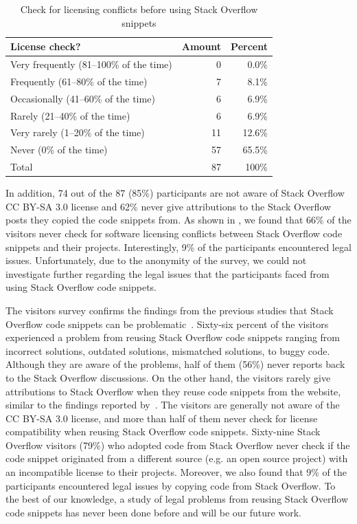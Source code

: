 \documentclass[10pt,journal,compsoc]{IEEEtran}
\begin{document}
\begin{table}
	\centering
	\caption{Check for licensing conflicts before using Stack Overflow snippets}
	\label{tab:visitor_survey_license_check}
	\begin{tabular}{lrr}
		\toprule
		License check? & Amount & Percent \\
		\midrule
		Very frequently (81--100\% of the time) & 0 & 0.0\% \\
		Frequently (61--80\% of the time) & 7 & 8.1\%
\\
		Occasionally (41--60\% of the time) & 6 & 6.9\%
\\
		Rarely (21--40\% of the time) & 6 & 6.9\% \\
		Very rarely (1--20\% of the time) & 11 & 12.6\% \\
		Never (0\% of the time)	& 57 & 65.5\% \\
		\midrule
		Total & 87 & 100\% \\
\bottomrule
\end{tabular}
\end{table}

In addition, 74 out of the 87 (85\%) participants are not
aware of Stack Overflow CC BY-SA 3.0 license and 62\% never give attributions to
the Stack Overflow posts they copied the code snippets from. 
As shown in , we found that 66\%
of the visitors never check for software licensing conflicts between Stack
Overflow code snippets and their projects. Interestingly, 9\% of the
participants encountered legal issues. Unfortunately, due to the anonymity of
the survey, we could not investigate further regarding the legal issues that the
participants faced from using Stack Overflow code snippets.

The visitors survey confirms the findings from the previous studies that Stack
Overflow code snippets can be problematic~\cite{Zhang2018,Acar2016,An2017,Fischer2017}. Sixty-six
percent of the visitors experienced a problem from reusing Stack Overflow code
snippets ranging from incorrect solutions, outdated solutions, mismatched
solutions, to buggy code. Although they are aware of the problems, half of them
(56\%) never reports back to the Stack Overflow discussions. On the other hand,
the visitors rarely give attributions to Stack Overflow when they reuse code
snippets from the website, similar to the findings reported
by~\cite{Baltes2017}. The visitors are generally not aware of the CC BY-SA 3.0
license, and more than half of them never check for license compatibility when
reusing Stack Overflow code snippets. 
Sixty-nine Stack Overflow visitors (79\%) who adopted code from Stack Overflow never 
check if the code snippet originated from a different source (e.g. an open source project) 
with an incompatible license to their projects.
Moreover, we also found that 9\% of the participants
encountered legal issues by copying code from Stack Overflow. To the best of our
knowledge, a study of legal problems from reusing Stack Overflow code snippets
has never been done before and will be our future work.
\end{document}
